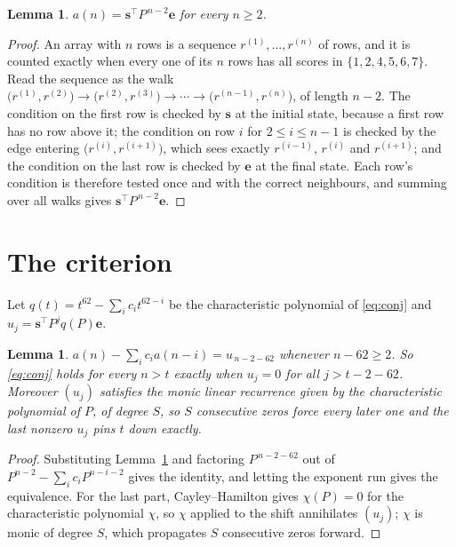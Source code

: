 \documentclass[11pt,a4paper]{article}
\theoremstyle{plain}
\newtheorem{lemma}[theorem]{Lemma}
\theoremstyle{definition}
\begin{document}
\begin{lemma}\label{lem:walk}
$a(n)=\mathbf{s}^{\!\top}P^{\,n-2}\mathbf{e}$ for every $n\ge2$.
\end{lemma}

\begin{proof}
An array with $n$ rows is a sequence $r^{(1)},\dots,r^{(n)}$ of rows, and it is counted
exactly when every one of its $n$ rows has all scores in $\{1,2,4,5,6,7\}$. Read the sequence as the
walk $\bigl(r^{(1)},r^{(2)}\bigr)\to\bigl(r^{(2)},r^{(3)}\bigr)\to\cdots\to
\bigl(r^{(n-1)},r^{(n)}\bigr)$, of length $n-2$. The condition on the first row is
checked by $\mathbf{s}$ at the initial state, because a first row has no row above it; the
condition on row $i$ for $2\le i\le n-1$ is checked by the edge entering
$\bigl(r^{(i)},r^{(i+1)}\bigr)$, which sees exactly $r^{(i-1)}$, $r^{(i)}$ and
$r^{(i+1)}$; and the condition on the last row is checked by $\mathbf{e}$ at the final
state. Each row's condition is therefore tested once and with the correct neighbours, and
summing over all walks gives $\mathbf{s}^{\!\top}P^{\,n-2}\mathbf{e}$.
\end{proof}

\section{The criterion}

Let $q(t)=t^{62}-\sum_i c_i t^{62-i}$ be the characteristic polynomial of
\eqref{eq:conj} and $u_j=\mathbf{s}^{\!\top}P^{j}q(P)\mathbf{e}$.

\begin{lemma}\label{lem:crit}
$a(n)-\sum_i c_i a(n-i)=u_{\,n-2-62}$ whenever $n-62\ge2$. So \eqref{eq:conj}
holds for every $n>t$ exactly when $u_j=0$ for all $j>t-2-62$. Moreover $(u_j)$
satisfies the monic linear recurrence given by the characteristic polynomial of $P$, of
degree $S$, so $S$ consecutive zeros force every later one and the last nonzero $u_j$ pins
$t$ down exactly.
\end{lemma}

\begin{proof}
Substituting Lemma~\ref{lem:walk} and factoring $P^{\,n-2-62}$ out of
$P^{n-2}-\sum_i c_i P^{n-i-2}$ gives the identity, and letting the exponent run gives the
equivalence. For the last part, Cayley--Hamilton gives $\chi(P)=0$ for the characteristic
polynomial $\chi$, so $\chi$ applied to the shift annihilates $(u_j)$; $\chi$ is monic of
degree $S$, which propagates $S$ consecutive zeros forward.
\end{proof}
\end{document}
